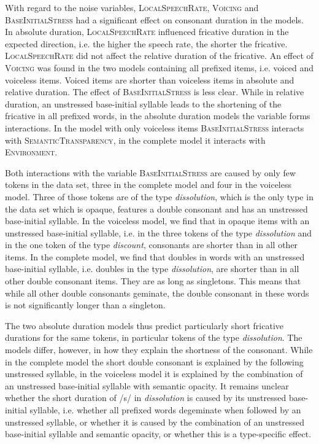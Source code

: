 With regard to the noise variables, \textsc{LocalSpeechRate}, \textsc{Voicing}  and \textsc{BaseInitialStress} had a significant effect on consonant duration in the models. 
In absolute duration, \textsc{LocalSpeechRate} influenced fricative duration in the expected direction, i.e. the higher the speech rate, the shorter the fricative. \textsc{LocalSpeechRate} did not affect the relative duration of the fricative. 
An effect of \textsc{Voicing} was found in the two models containing all prefixed items, i.e. voiced and voiceless items. Voiced items are shorter than voiceless items in absolute and relative duration.
The effect of \textsc{BaseInitialStress} is less clear. While in relative duration, an unstressed base-initial syllable leads to the shortening of the fricative in all prefixed words, in the absolute duration models the variable forms interactions. In the model with only voiceless items \textsc{BaseInitialStress} interacts with \textsc{SemanticTransparency},  in the complete model it interacts with \textsc{Environment}.



Both interactions with the variable \textsc{BaseInitialStress} are caused by only few tokens in the data set, three in the complete model and four in the voiceless model. Three of those tokens are of the type \textit{dissolution}, which is the only type in the data set which is opaque, features a double consonant and has an unstressed base-initial syllable. 
In the voiceless model, we find that in opaque items with an unstressed base-initial syllable, i.e. in the three tokens of the type \textit{dissolution} and in the one token of the type \textit{discount}, consonants are shorter than in all other items. 
In the complete model, we find that doubles in words with an unstressed base-initial syllable, i.e. doubles in the type \textit{dissolution}, are shorter than in all other double consonant items. They are as long as singletons. This means that while all other double consonants geminate, the double consonant in these words is not significantly longer than a singleton.

The two absolute duration models thus predict particularly short fricative durations for the same tokens, in particular tokens of the type \textit{dissolution}. The models differ, however, in how they explain the shortness of the consonant. While in the complete model the short double consonant is explained by the following unstressed syllable, in the voiceless model it is explained by the combination of an unstressed base-initial syllable with semantic opacity. It remains unclear whether the short duration of /s/ in \textit{dissolution} is caused by its unstressed base-initial syllable, i.e. whether all prefixed words degeminate when followed by an unstressed syllable, or whether it is caused by the combination of an unstressed base-initial syllable and semantic opacity, or whether this is a type-specific effect.


